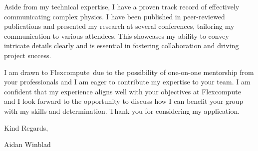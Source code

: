 \documentclass[12pt]{letter}
\newcommand{\myname}{Aidan Winblad} %
\newcommand{\mytitle}{Applicant} %
\newcommand{\closer}{Kind Regards} %
\newcommand{\company}{Flexcompute} %
\begin{document}
Aside from my technical expertise, I have a proven track record of effectively communicating complex physics.
I have been published in peer-reviewed publications and presented my research at several conferences, tailoring my communication to various attendees.
This showcases my ability to convey intricate details clearly and is essential in fostering collaboration and driving project success.

I am drawn to \company\ due to the possibility of one-on-one mentorship from your professionals and I am eager to contribute my expertise to your team.
I am confident that my experience aligns well with your objectives at \company\, and I look forward to the opportunity to discuss how I can benefit your group with my skills and determination. Thank you for considering my application.

\vspace{0.1in}
\vfill

\begin{flushright}
\closer,

\myname\\
\end{flushright}
\end{document}
